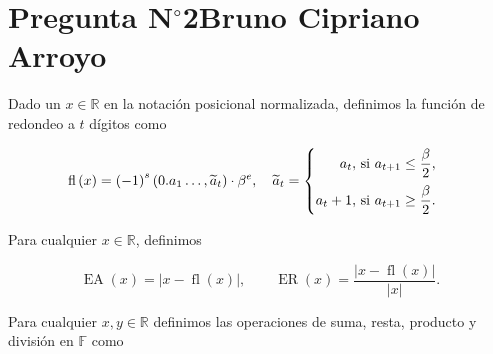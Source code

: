 \section{Pregunta N$^{\circ}$2\qquad Bruno Cipriano Arroyo}

\begin{frame}

	\begin{definition}
		Dado un $x\in\mathbb{R}$ en la notación posicional normalizada,
		definimos la función de redondeo a $t$ dígitos como

		\begin{equation*}
			\operatorname{fl}\left(x\right)=
			{\left(-1\right)}^{s}
			\left(
			0.a_{1}\dotsc,\widetilde{a}_{t}
			\right)\cdot
			\beta^{e},\quad
			\widetilde{a}_{t}=
			\begin{cases}
				\begin{aligned}
					a_{t},
					 & \text{ si }a_{t+1}\leq\frac{\beta}{2}, \\[\baselineskip]
					a_{t}+1,
					 & \text{ si }a_{t+1}\geq\frac{\beta}{2}.
				\end{aligned}
			\end{cases}
		\end{equation*}

	\end{definition}

	\begin{definition}
		Para cualquier $x\in\mathbb{R}$, definimos

		\begin{equation*}
			\operatorname{EA}\left(x\right)=
			\left|
			x-
			\operatorname{fl}\left(x\right)\right|,\qquad
			\operatorname{ER}\left(x\right)=
			\frac{
				\left|
				x-
				\operatorname{fl}\left(x\right)\right|
			}{
				\left|
				x
				\right|
			}.
		\end{equation*}

	\end{definition}

	\begin{definition}
		Para cualquier $x,y\in\mathbb{R}$ definimos las operaciones de
		suma, resta, producto y división en $\mathbb{F}$ como


\end{definition}
\end{frame}
